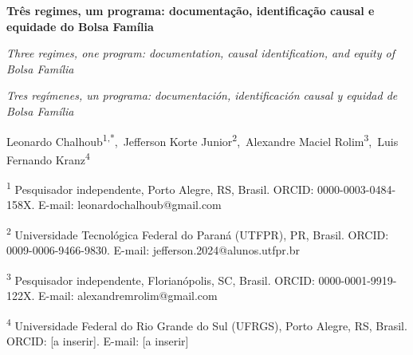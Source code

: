 \documentclass[12pt,a4paper,oneside]{article}
\begin{document}
\begin{center}{\LARGE\bfseries Três regimes, um programa: documentação, identificação causal e equidade do Bolsa Família\par}\end{center}

\begin{center}{\large\itshape Three regimes, one program: documentation, causal identification, and equity of Bolsa Família\par}\end{center}

\begin{center}{\large\itshape Tres regímenes, un programa: documentación, identificación causal y equidad de Bolsa Família\par}\end{center}

\begin{center}{\large Leonardo Chalhoub\textsuperscript{1,*},~Jefferson Korte Junior\textsuperscript{2},~Alexandre Maciel Rolim\textsuperscript{3},~Luis Fernando Kranz\textsuperscript{4}\par}\end{center}

\begin{center}{\footnotesize\textsuperscript{1} Pesquisador independente, Porto Alegre, RS, Brasil. ORCID: 0000-0003-0484-158X. E-mail: leonardochalhoub@gmail.com\par}\end{center}

\begin{center}{\footnotesize\textsuperscript{2} Universidade Tecnológica Federal do Paraná (UTFPR), PR, Brasil. ORCID: 0009-0006-9466-9830. E-mail: jefferson.2024@alunos.utfpr.br\par}\end{center}

\begin{center}{\footnotesize\textsuperscript{3} Pesquisador independente, Florianópolis, SC, Brasil. ORCID: 0000-0001-9919-122X. E-mail: alexandremrolim@gmail.com\par}\end{center}

\begin{center}{\footnotesize\textsuperscript{4} Universidade Federal do Rio Grande do Sul (UFRGS), Porto Alegre, RS, Brasil. ORCID: [a inserir]. E-mail: [a inserir]\par}\end{center}
\end{document}
